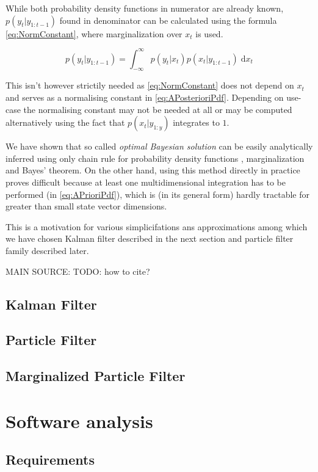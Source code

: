 \documentclass[a4paper,12pt,oneside]{report}
\newcommand{\pdfs}{probability density functions }
\begin{document}
While both \pdfs in numerator are already known, \(p(y_t|y_{1:t-1})\) found in denominator can be
calculated using the formula \eqref{eq:NormConstant}, where marginalization over \(x_t\) is used.

\begin{equation} \label{eq:NormConstant}
	p(y_t | y_{1:t-1}) = \int_{-\infty}^{\infty} p(y_t | x_t) p(x_t | y_{1:t-1}) \; \mathrm{d} x_{t}
\end{equation}

This isn't however strictily needed as \eqref{eq:NormConstant} does not depend on \(x_t\) and
serves as a normalising constant in \eqref{eq:APosterioriPdf}. Depending on use-case the normalising
constant may not be needed at all or may be computed alternatively using the fact that \(p(x_t | y_{1:y})\)
integrates to \(1\).

We have shown that so called \emph{optimal Bayesian solution} can be easily analytically inferred
using only chain rule for \pdfs, marginalization and Bayes' theorem. On the other hand, using this
method directly in practice proves difficult because at least one multidimensional integration has
to be performed (in \eqref{eq:APrioriPdf}), which is (in its general form) hardly tractable for
greater than small state vector dimensions.

This is a motivation for various simplicifations ans approximations among which we have chosen
Kalman filter described in the next section and particle filter family described later.

MAIN SOURCE: \cite{AruMasGor:02} TODO: how to cite?

\section{Kalman Filter}

\section{Particle Filter}

\section{Marginalized Particle Filter}


\chapter{Software analysis}

\section{Requirements}
\end{document}
